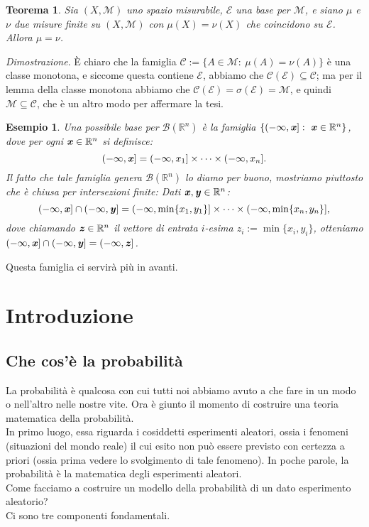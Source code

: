 \documentclass[11pt]{book}
\makeatletter
\theoremstyle{Definizione}
\theoremstyle{TeoremaProposizioneLemmaCorollario}
\newtheorem{myteo}{Teorema}[section]
\theoremstyle{OsservazioneNota}
\newtheorem{myes}{Esempio}[section]
\renewenvironment{proof}[1][\proofname]{\par
  \normalfont \topsep6\p@\@plus6\p@\relax
  \trivlist
  \item[\hskip\labelsep
        \itshape
    #1\@addpunct{.}]\ignorespaces
}{%
  \endtrivlist\@endpefalse
}
\newcommand{\R}{\mathbb{R}}
\newcommand{\gri}[1]{\textbf{\textit{{#1}}}}
\renewenvironment{proof}{\textsl{Dimostrazione}.}{}
\makeatother
\begin{document}
\begin{boxteo}{}
\begin{myteo}\label{teo:MisureFiniteUgualiSuBaseAlloraUgualiOvunque}
Sia $(X,\mathcal{M})$ uno spazio misurabile, $\mathcal{E}$ una base per $\mathcal{M}$, e siano $\mu$ e $\nu$ due misure finite su $(X,\mathcal{M})$ con $\mu(X) = \nu(X)$ che coincidono su $\mathcal{E}$. Allora $\mu = \nu$.
\end{myteo}
\tcblower
\begin{proof}
È chiaro che la famiglia $\mathcal{C}:= \{A\in \mathcal{M}:\ \mu(A) = \nu(A)\}$ è una classe monotona, e siccome questa contiene $\mathcal{E}$, abbiamo che $\mathcal{C}(\mathcal{E}) \subseteq \mathcal{C}$; ma per il lemma della classe monotona abbiamo che $\mathcal{C}(\mathcal{E}) = \sigma(\mathcal{E}) = \mathcal{M}$, e quindi $\mathcal{M} \subseteq \mathcal{C}$, che è un altro modo per affermare la tesi.
\end{proof}
\end{boxteo}
\begin{myes}
Una possibile base per $\mathcal{B}(\R^n)$ è la famiglia $\{(-\infty,\gri{x}]:\ \gri{x}\in \R^n\}$, dove per ogni $\gri{x}\in \R^n$ si definisce:
$$
(-\infty,\gri{x}] = (-\infty,x_1]\times \cdots \times (-\infty,x_n].
$$
Il fatto che tale famiglia genera $\mathcal{B}(\R^n)$ lo diamo per buono, mostriamo piuttosto che è chiusa per intersezioni finite: Dati $\gri{x},\gri{y}\in \R^n$:
$$
(-\infty,\gri{x}]\cap (-\infty,\gri{y}] = (-\infty,\min\{x_1,y_1\}]\times \cdots \times (-\infty,\min\{x_n,y_n\}],
$$
dove chiamando $\gri{z}\in \R^n$ il vettore di entrata $i$-esima $z_i := \min\{x_i,y_i\}$, otteniamo $(-\infty,\gri{x}]\cap (-\infty,\gri{y}] = (-\infty,\gri{z}]$.
\end{myes}
Questa famiglia ci servirà più in avanti.
\chapter{Introduzione}
\section{Che cos'è la probabilità}
La probabilità è qualcosa con cui tutti noi abbiamo avuto a che fare in un modo o nell'altro nelle nostre vite. Ora è giunto il momento di costruire una teoria matematica della probabilità.\\
In primo luogo, essa riguarda i cosiddetti esperimenti aleatori, ossia i fenomeni (situazioni del mondo reale) il cui esito non può essere previsto con certezza a priori (ossia prima vedere lo svolgimento di tale fenomeno).
In poche parole, la probabilità è la matematica degli esperimenti aleatori.\\
Come facciamo a costruire un modello della probabilità di un dato esperimento aleatorio?\\
Ci sono tre componenti fondamentali.
\end{document}
